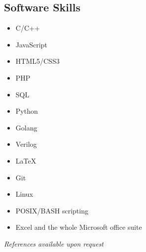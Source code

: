 \documentclass[9pt,a4paper]{article}
\begin{document}
\begin{multicols*}{2}
\iftrue
\section*{Software Skills}
\begin{multicols*}{2}
\begin{itemize}
\item C/C++
\item JavaScript
\item HTML5/CSS3
\item PHP
\item SQL
\item Python
\item Golang
\item Verilog
\item \LaTeX 
\item Git
\item Linux
\item POSIX/BASH scripting
\item Excel and the whole Microsoft office suite
\end{itemize}
\end{multicols*}
\fi
\vfill
\textit{References available upon request}
\end{multicols*}
\end{document}
